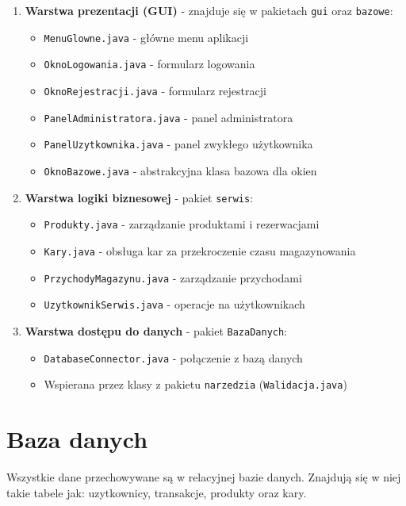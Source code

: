 \begin{enumerate}
    \item \textbf{Warstwa prezentacji (GUI)} - znajduje się w pakietach \texttt{gui} oraz \texttt{bazowe}:
    \begin{itemize}
        \item \texttt{MenuGlowne.java} - główne menu aplikacji
        \item \texttt{OknoLogowania.java} - formularz logowania
        \item \texttt{OknoRejestracji.java} - formularz rejestracji
        \item \texttt{PanelAdministratora.java} - panel administratora
        \item \texttt{PanelUzytkownika.java} - panel zwykłego użytkownika
        \item \texttt{OknoBazowe.java} - abstrakcyjna klasa bazowa dla okien
    \end{itemize}
    
    \item \textbf{Warstwa logiki biznesowej} - pakiet \texttt{serwis}:
    \begin{itemize}
        \item \texttt{Produkty.java} - zarządzanie produktami i rezerwacjami
        \item \texttt{Kary.java} - obsługa kar za przekroczenie czasu magazynowania
        \item \texttt{PrzychodyMagazynu.java} - zarządzanie przychodami
        \item \texttt{UzytkownikSerwis.java} - operacje na użytkownikach
    \end{itemize}
    
    \item \textbf{Warstwa dostępu do danych} - pakiet \texttt{BazaDanych}:
    \begin{itemize}
        \item \texttt{DatabaseConnector.java} - połączenie z bazą danych
        \item Wspierana przez klasy z pakietu \texttt{narzedzia} (\texttt{Walidacja.java})
    \end{itemize}
\end{enumerate}
\clearpage
\section{Baza danych}
\label{sec:Baza danych}
Wszystkie dane przechowywane są w relacyjnej bazie danych. Znajdują się w niej takie tabele jak: uzytkownicy, transakcje, produkty oraz kary.

